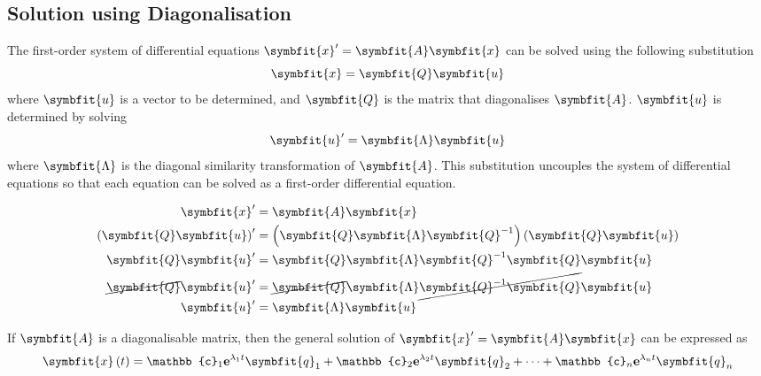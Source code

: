 \documentclass{article}
\begin{document}
	\subsection{Solution using Diagonalisation}
	\begin{theorem}
		The first-order system of differential equations $\symbfit{x}' = \symbfit{A} \symbfit{x}$ can be solved using the following substitution
		\begin{equation*}
			\symbfit{x}=\symbfit{Q}\symbfit{u}
		\end{equation*}
		where $\symbfit{u}$ is a vector to be determined, and $\symbfit{Q}$ is the matrix that diagonalises $\symbfit{A}$. $\symbfit{u}$ is determined by solving
		\begin{equation*}
			\symbfit{u}' = \symbfit{\Lambda} \symbfit{u}
		\end{equation*}
		where $\symbfit{\Lambda}$ is the diagonal similarity transformation of $\symbfit{A}$. This substitution uncouples the system of differential equations so that each equation can be solved as a first-order differential equation.
	\end{theorem}
	\begin{solutionF}[Proof]
		\begingroup 
		\allowdisplaybreaks
		\begin{align*}
			\symbfit{x}' &= \symbfit{A} \symbfit{x} \\
			\left( \symbfit{Q}\symbfit{u} \right)' &= \left( \symbfit{Q}\symbfit{\Lambda} \symbfit{Q}^{-1} \right)\left( \symbfit{Q}\symbfit{u} \right) \\
			\symbfit{Q}\symbfit{u}' &= \symbfit{Q}\symbfit{\Lambda} \symbfit{Q}^{-1} \symbfit{Q}\symbfit{u} \\
			\cancel{\symbfit{Q}}\symbfit{u}' &= \cancel{\symbfit{Q}}\symbfit{\Lambda} \cancel{\symbfit{Q}^{-1} \symbfit{Q}}\symbfit{u} \\
			\symbfit{u}' &= \symbfit{\Lambda} \symbfit{u}
		\end{align*}
		\endgroup
	\end{solutionF}
	\begin{theorem}
		If $\symbfit{A}$ is a diagonalisable matrix, then the general solution of $\symbfit{x}' = \symbfit{A} \symbfit{x}$ can be expressed as
		\begin{equation*}
			\func{\symbfit{x}}{t} = \mathbb{c}_1 \e^{\lambda_1 t} \symbfit{q}_1 + \mathbb{c}_2 \e^{\lambda_2 t} \symbfit{q}_2 + \cdots + \mathbb{c}_n \e^{\lambda_n t} \symbfit{q}_n
		\end{equation*}
	\end{theorem}
\end{document}
